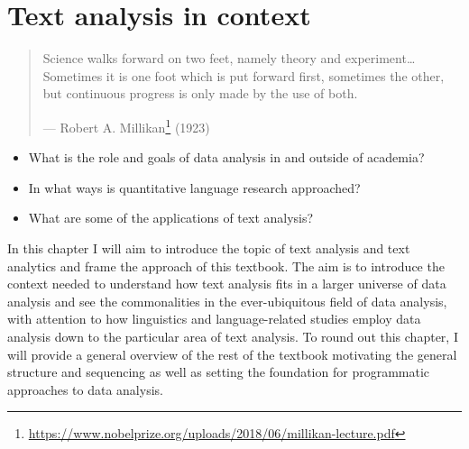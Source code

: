 \documentclass[
  letterpaper,
]{scrbook}
\providecommand{\tightlist}{%
  \setlength{\itemsep}{0pt}\setlength{\parskip}{0pt}}\usepackage{longtable,booktabs,array}
\DeclareRobustCommand{\href}[2]{#2\footnote{\url{#1}}}
\begin{document}
\hypertarget{sec-text-analysis-in-context}{%
\chapter{Text analysis in context}\label{sec-text-analysis-in-context}}

\begin{quote}
Science walks forward on two feet, namely theory and
experiment\ldots Sometimes it is one foot which is put forward first,
sometimes the other, but continuous progress is only made by the use of
both.

---
\href{https://www.nobelprize.org/uploads/2018/06/millikan-lecture.pdf}{Robert
A. Millikan} (1923)
\end{quote}

\begin{tcolorbox}[enhanced jigsaw, title=\textcolor{quarto-callout-note-color}{\faInfo}\hspace{0.5em}{Keys}, breakable, colback=white, colframe=quarto-callout-note-color-frame, bottomrule=.15mm, left=2mm, bottomtitle=1mm, colbacktitle=quarto-callout-note-color!10!white, opacityback=0, arc=.35mm, toprule=.15mm, coltitle=black, leftrule=.75mm, opacitybacktitle=0.6, toptitle=1mm, titlerule=0mm, rightrule=.15mm]

\begin{itemize}
\tightlist
\item
  What is the role and goals of data analysis in and outside of
  academia?
\item
  In what ways is quantitative language research approached?
\item
  What are some of the applications of text analysis?
\end{itemize}

\end{tcolorbox}

In this chapter I will aim to introduce the topic of text analysis and
text analytics and frame the approach of this textbook. The aim is to
introduce the context needed to understand how text analysis fits in a
larger universe of data analysis and see the commonalities in the
ever-ubiquitous field of data analysis, with attention to how
linguistics and language-related studies employ data analysis down to
the particular area of text analysis. To round out this chapter, I will
provide a general overview of the rest of the textbook motivating the
general structure and sequencing as well as setting the foundation for
programmatic approaches to data analysis.
\end{document}
